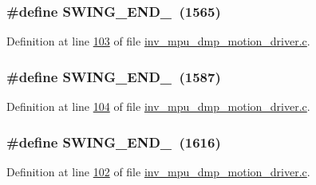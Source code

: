 \subsubsection[{\texorpdfstring{S\+W\+I\+N\+G\+\_\+\+E\+N\+D\+\_\+2}{SWING_END_2}}]{\setlength{\rightskip}{0pt plus 5cm}\#define S\+W\+I\+N\+G\+\_\+\+E\+N\+D\+\_~(1565)}\hypertarget{group___d_r_i_v_e_r_s_ga8a156eab56c25c1f9156a2751fa2155d}{}\label{group___d_r_i_v_e_r_s_ga8a156eab56c25c1f9156a2751fa2155d}


Definition at line \hyperlink{inv__mpu__dmp__motion__driver_8c_source_l00103}{103} of file \hyperlink{inv__mpu__dmp__motion__driver_8c_source}{inv\+\_\+mpu\+\_\+dmp\+\_\+motion\+\_\+driver.\+c}.

\subsubsection[{\texorpdfstring{S\+W\+I\+N\+G\+\_\+\+E\+N\+D\+\_\+3}{SWING_END_3}}]{\setlength{\rightskip}{0pt plus 5cm}\#define S\+W\+I\+N\+G\+\_\+\+E\+N\+D\+\_~(1587)}\hypertarget{group___d_r_i_v_e_r_s_ga3ff31c1255dc1fceb7c590bc7f0b3ab0}{}\label{group___d_r_i_v_e_r_s_ga3ff31c1255dc1fceb7c590bc7f0b3ab0}


Definition at line \hyperlink{inv__mpu__dmp__motion__driver_8c_source_l00104}{104} of file \hyperlink{inv__mpu__dmp__motion__driver_8c_source}{inv\+\_\+mpu\+\_\+dmp\+\_\+motion\+\_\+driver.\+c}.

\subsubsection[{\texorpdfstring{S\+W\+I\+N\+G\+\_\+\+E\+N\+D\+\_\+4}{SWING_END_4}}]{\setlength{\rightskip}{0pt plus 5cm}\#define S\+W\+I\+N\+G\+\_\+\+E\+N\+D\+\_~(1616)}\hypertarget{group___d_r_i_v_e_r_s_gaa6efdc55c49bd242ffafb9a9b227cca8}{}\label{group___d_r_i_v_e_r_s_gaa6efdc55c49bd242ffafb9a9b227cca8}


Definition at line \hyperlink{inv__mpu__dmp__motion__driver_8c_source_l00102}{102} of file \hyperlink{inv__mpu__dmp__motion__driver_8c_source}{inv\+\_\+mpu\+\_\+dmp\+\_\+motion\+\_\+driver.\+c}.


